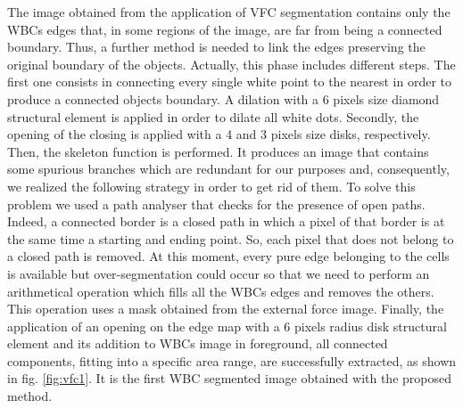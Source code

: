\documentclass[final,a4paper,12pt,english]{UnicaPhdThesis3}
\begin{document}
The image obtained from the application of VFC segmentation contains only the WBCs edges that, in some regions of the image, are far from being a connected boundary. Thus, a further method is needed to link the edges preserving the original boundary of the objects. Actually, this phase includes different steps. The first one consists in connecting every single white point to the nearest in order to produce a connected objects boundary. A dilation with a 6 pixels size diamond structural element is applied in order to dilate all white dots. Secondly, the opening of the closing is applied with a 4 and 3 pixels size disks, respectively. Then, the skeleton function is performed. It produces an image that contains some spurious branches which are redundant for our purposes and, consequently, we realized the following strategy in order to get rid of them. 
To solve this problem we used a path analyser that checks for the presence of open paths. Indeed, a connected border is a closed path in which a pixel of that border is at the same time a starting and ending point. So, each pixel that does not belong to a closed path is removed.
At this moment, every pure edge belonging to the cells is available but over-segmentation could occur so that we need to perform an arithmetical operation which fills all the WBCs edges and removes the others. This operation uses a mask obtained from the external force image.
Finally, the application of an opening on the edge map with a 6 pixels radius disk structural element and its addition to WBCs image in foreground, all connected components, fitting into a specific area range, are successfully extracted, as shown in fig. \ref{fig:vfc1}. It is the first WBC segmented image obtained with the proposed method.
\end{document}
